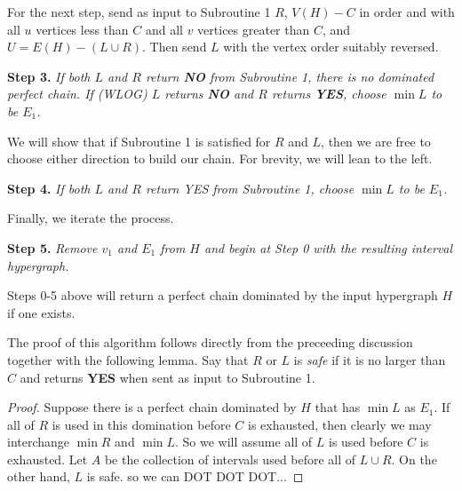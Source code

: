 For the next step, send as input to Subroutine 1 $R$, $V(H)-C$ in order and with all $u$ vertices less than $C$ and all $v$ vertices greater than $C$, and $U = E(H) - (L\cup R)$.  Then send $L$ with the vertex order suitably reversed.
%

\begin{framed}{\bf Step 3.} {\it If both $L$ and $R$ return {\bf NO} from Subroutine 1, there is no dominated perfect chain.  If (WLOG) $L$ returns {\bf NO} and $R$ returns {\bf YES}, choose $\min L$ to be $E_1$.}  
\end{framed}

We will show that if Subroutine 1 is satisfied for $R$ and $L$, then we are free to choose either direction to build our chain.  For brevity, we will lean to the left.

\begin{framed}{\bf Step 4.} {\it If both $L$ and $R$ return {\it YES} from Subroutine 1, choose $\min L$ to be $E_1$.}
\end{framed}

Finally, we iterate the process.

\begin{framed}{\bf Step 5.} {\it Remove $v_1$ and $E_1$ from $H$ and begin at Step 0 with the resulting interval hypergraph.}
\end{framed}
\begin{theorem}\label{convex_alg}
	Steps 0-5 above will return a perfect chain dominated by the input hypergraph $H$ if one exists.
\end{theorem}


The proof of this algorithm follows directly from the preceeding discussion together with the following lemma.  Say that $R$ or $L$ is {\it safe} if it is no larger than $C$ and returns {\bf YES} when sent as input to Subroutine 1.
\begin{proof}
	Suppose there is a perfect chain dominated by $H$ that has $\min L$ as $E_1$.  If all of $R$ is used in this domination before $C$ is exhausted, then clearly we may interchange $\min R$ and $\min L$.  So we will assume all of $L$ is used before $C$ is exhausted.   Let $A$ be the collection of intervals used before all of $L\cup R$.  On the other hand, $L$ is safe. so we can DOT DOT DOT...
\end{proof}
 